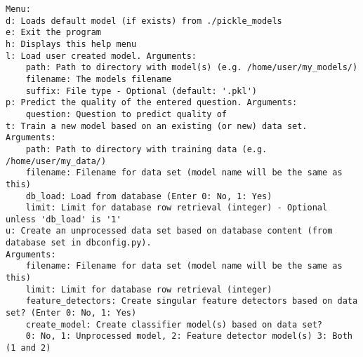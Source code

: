 \begin{lstlisting}[caption={System menu}, 
label={lst:system_menu}, basicstyle=\small] 
Menu: 
d: Loads default model (if exists) from ./pickle_models
e: Exit the program
h: Displays this help menu
l: Load user created model. Arguments: 
	path: Path to directory with model(s) (e.g. /home/user/my_models/) 
	filename: The models filename 
	suffix: File type - Optional (default: '.pkl')
p: Predict the quality of the entered question. Arguments: 
	question: Question to predict quality of 
t: Train a new model based on an existing (or new) data set. Arguments: 
	path: Path to directory with training data (e.g. /home/user/my_data/) 
	filename: Filename for data set (model name will be the same as this) 
	db_load: Load from database (Enter 0: No, 1: Yes) 
	limit: Limit for database row retrieval (integer) - Optional unless 'db_load' is '1'
u: Create an unprocessed data set based on database content (from database set in dbconfig.py). 
Arguments: 
	filename: Filename for data set (model name will be the same as this) 
	limit: Limit for database row retrieval (integer) 
	feature_detectors: Create singular feature detectors based on data set? (Enter 0: No, 1: Yes) 
	create_model: Create classifier model(s) based on data set? 
	0: No, 1: Unprocessed model, 2: Feature detector model(s) 3: Both (1 and 2)
\end{lstlisting}

